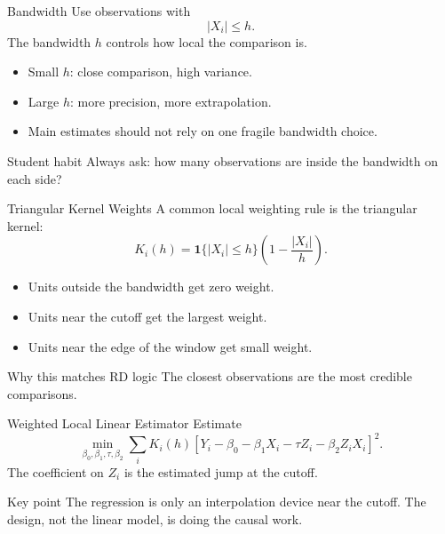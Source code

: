 \documentclass[11pt,aspectratio=169]{beamer}
\newcommand{\derivbutton}[1]{\vspace{0.4em}\hfill\hyperlink{app:#1}{\beamerbutton{Appendix details}}}
\begin{document}
\begin{frame}{Bandwidth}
  Use observations with
  \[
    |X_i|\leq h.
  \]
  The bandwidth \(h\) controls how local the comparison is.
  \begin{itemize}
    \item Small \(h\): close comparison, high variance.
    \item Large \(h\): more precision, more extrapolation.
    \item Main estimates should not rely on one fragile bandwidth choice.
  \end{itemize}
  \begin{block}{Student habit}
    Always ask: how many observations are inside the bandwidth on each side?
  \end{block}
\end{frame}

\begin{frame}{Triangular Kernel Weights}
  A common local weighting rule is the triangular kernel:
  \[
    K_i(h)
    =
    \mathbf{1}\{|X_i|\leq h\}
    \left(1-\frac{|X_i|}{h}\right).
  \]
  \begin{itemize}
    \item Units outside the bandwidth get zero weight.
    \item Units near the cutoff get the largest weight.
    \item Units near the edge of the window get small weight.
  \end{itemize}
  \begin{block}{Why this matches RD logic}
    The closest observations are the most credible comparisons.
  \end{block}
\end{frame}

\begin{frame}{Weighted Local Linear Estimator}
  \hypertarget{main:wls}{}
  Estimate
  \[
    \min_{\beta_0,\beta_1,\tau,\beta_2}
    \sum_i
    K_i(h)
    \left[
      Y_i-\beta_0-\beta_1X_i-\tau Z_i-\beta_2Z_iX_i
    \right]^2.
  \]
  The coefficient on \(Z_i\) is the estimated jump at the cutoff.
  \begin{block}{Key point}
    The regression is only an interpolation device near the cutoff. The design, not the linear model, is doing the causal work.
  \end{block}
  \derivbutton{local-linear}
\end{frame}
\end{document}

